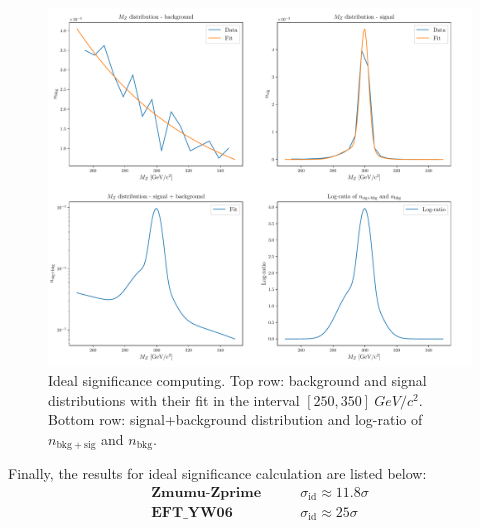 \begin{figure}[H]
	\centering
	\includegraphics[width=1.0\textwidth]{Python/RESULTS/ID_SIG/id_sig_Zmumu_Zprime.pdf}
	\caption{Ideal significance computing. Top row: background and signal distributions with their fit in the interval $[250,350]~\si{GeV/c^2}$. Bottom row: signal+background distribution and log-ratio of $n_\mathrm{bkg+sig}$ and $n_\mathrm{bkg}$.}
	\label{fig:ID_SIG_ZMUMU_ZPRIME}
\end{figure}

Finally, the results for ideal significance calculation are listed below\footnotemark:
\begin{align*}
	\textbf{Zmumu-Zprime}	&	\qquad	\sigma_\mathrm{id} \approx 11.8\sigma	\\
	\textbf{EFT\_YW06}		&	\qquad	\sigma_\mathrm{id} \approx 25\sigma	
\end{align*}





